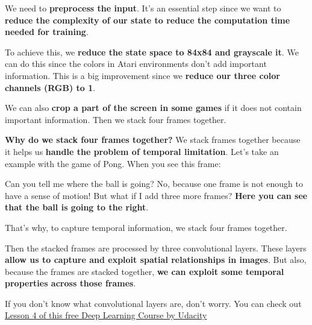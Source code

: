 \documentclass[11pt,a4paper]{article}
\begin{document}
We need to \textbf{preprocess the input}. It's an essential step since we want to \textbf{reduce the complexity of our state to reduce the computation time needed for training}.

To achieve this, we \textbf{reduce the state space to 84x84 and grayscale it}. We can do this since the colors in Atari environments don't add important information. This is a big improvement since we \textbf{reduce our three color channels (RGB) to 1}.

We can also \textbf{crop a part of the screen in some games} if it does not contain important information. Then we stack four frames together.


\textbf{Why do we stack four frames together?} We stack frames together because it helps us \textbf{handle the problem of temporal limitation}. Let's take an example with the game of Pong. When you see this frame:


Can you tell me where the ball is going? No, because one frame is not enough to have a sense of motion! But what if I add three more frames? \textbf{Here you can see that the ball is going to the right}.


That's why, to capture temporal information, we stack four frames together.

Then the stacked frames are processed by three convolutional layers. These layers \textbf{allow us to capture and exploit spatial relationships in images}. But also, because the frames are stacked together, \textbf{we can exploit some temporal properties across those frames}.

If you don't know what convolutional layers are, don't worry. You can check out \href{https://www.udacity.com/course/deep-learning-pytorch--ud188}{Lesson 4 of this free Deep Learning Course by Udacity}
\end{document}

